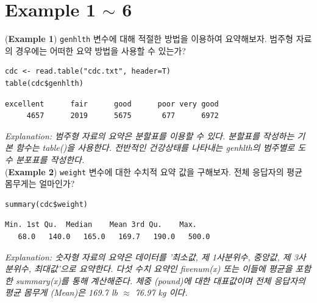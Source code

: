 \documentclass{article}
\begin{document}
\pagestyle{fancy}

\section*{Example 1 $\sim$ 6}
(\textbf{Example 1}) \texttt{genhlth} 변수에 대해 적절한 방법을 이용하여 요약해보자. 범주형 자료의 경우에는 어떠한 요약 방법을 사용할 수 있는가?
\begin{lstlisting}[style={r-style}]
cdc <- read.table("cdc.txt", header=T)
table(cdc$genhlth)
\end{lstlisting}
\begin{lstlisting}[style={out-style}]
excellent      fair      good      poor very good 
     4657      2019      5675       677      6972 
\end{lstlisting}
\emph{Explanation: 범주형 자료의 요약은 분할표를 이용할 수 있다. 분할표를 작성하는 기본 함수는 table()을 사용한다. 전반적인 건강상태를 나타내는 genhlth의 범주별로 도수 분포표를 작성한다.} \\

(\textbf{Example 2}) \texttt{weight} 변수에 대한 수치적 요약 값을 구해보자. 전체 응답자의 평균 몸무게는 얼마인가?
\begin{lstlisting}[style={r-style}]
summary(cdc$weight)
\end{lstlisting}
\begin{lstlisting}[style={out-style}]
   Min. 1st Qu.  Median    Mean 3rd Qu.    Max. 
   68.0   140.0   165.0   169.7   190.0   500.0 
\end{lstlisting}
\emph{Explanation: 숫자형 자료의 요약은 데이터를 '최소값, 제 1사분위수, 중앙값, 제 3사분위수, 최대값'으로 요약한다. 다섯 수치 요약인 fivenum(x) 또는 이들에 평균을 포함한 summary(x)를 통해 계산해준다. 체중 (pound)에 대한 대표값이며 전체 응답자의 평균 몸무게 (Mean)은 169.7 lb $\approx$ 76.97 kg 이다.} \\
\end{document}
